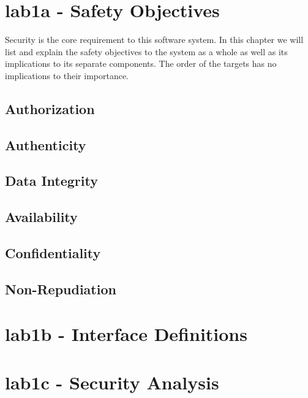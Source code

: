 \documentclass[12pt,a4paper,titlepage,oneside]{scrartcl}
\begin{document}
\maketitle
\setcounter{section}{0}
\setcounter{tocdepth}{2}
\tableofcontents

%
%

\section{lab1a - Safety Objectives}
Security is the core requirement to this software system. In this chapter we will list and explain the
safety objectives to the system as a whole as well as its implications to its separate components. The order
of the targets has no implications to their importance.

\subsection{Authorization}


\subsection{Authenticity}


\subsection{Data Integrity}


\subsection{Availability}


\subsection{Confidentiality}


\subsection{Non-Repudiation}


\section{lab1b - Interface Definitions}

\section{lab1c - Security Analysis}


%
%
\end{document}
